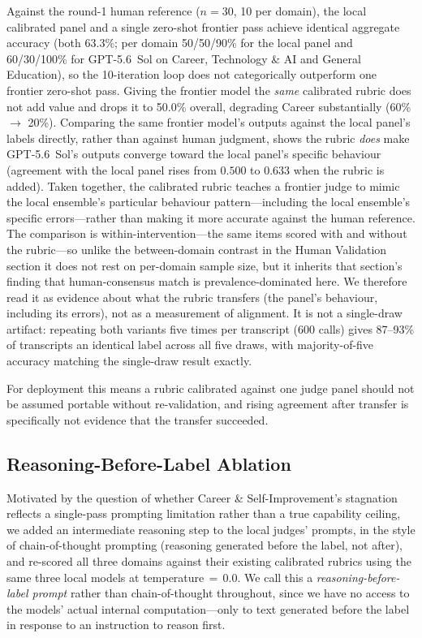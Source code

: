 \documentclass[letterpaper]{article}
\begin{document}
Against the round-1 human reference ($n=30$, 10 per domain), the local
calibrated panel and a single zero-shot frontier pass achieve identical
aggregate accuracy (both 63.3\%; per domain 50/50/90\% for the local panel
and 60/30/100\% for GPT-5.6~Sol on Career, Technology \& AI and General
Education), so the 10-iteration loop does not categorically outperform one
frontier zero-shot pass. Giving the frontier model the \emph{same} calibrated
rubric does not add value and drops it to 50.0\% overall, degrading Career
substantially (60\% $\rightarrow$ 20\%). Comparing the same
frontier model's outputs against the local panel's labels directly, rather
than against human judgment, shows the rubric \emph{does} make GPT-5.6~Sol's
outputs converge toward the local panel's specific behaviour (agreement with
the local panel rises from $0.500$ to $0.633$ when the rubric is added).
Taken together, the calibrated rubric teaches a frontier judge to mimic the
local ensemble's particular behaviour pattern---including the local
ensemble's specific errors---rather than making it more accurate against the
human reference. The comparison is within-intervention---the same items scored with and without
the rubric---so unlike the between-domain contrast in the
Human Validation section it does not rest on per-domain sample size, but it
inherits that section's finding that human-consensus match is
prevalence-dominated here. We therefore read it as evidence about what the
rubric transfers (the panel's behaviour, including its errors), not as a
measurement of alignment. It is not a single-draw artifact: repeating both
variants five times per transcript (600 calls) gives 87--93\% of transcripts
an identical label across all five draws, with majority-of-five accuracy
matching the single-draw result exactly.

For deployment this means a rubric calibrated against one judge panel should
not be assumed portable without re-validation, and rising agreement after
transfer is specifically not evidence that the transfer succeeded.

\subsection{Reasoning-Before-Label Ablation}
\label{sec:cot}

Motivated by the question of whether Career \& Self-Improvement's stagnation
reflects a single-pass prompting limitation rather than a true capability
ceiling, we added an intermediate reasoning step to the local judges'
prompts, in the style of chain-of-thought prompting
\citep{wei2022chainofthought} (reasoning generated before the label, not
after), and re-scored all three domains against their existing calibrated
rubrics using the same three local models at temperature\,$=$\,0.0. We call
this a \emph{reasoning-before-label prompt} rather than chain-of-thought
throughout, since we have no access to the models' actual internal
computation---only to text generated before the label in response to an
instruction to reason first.
\end{document}
